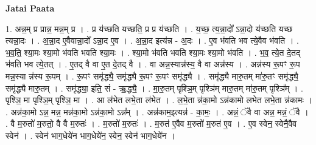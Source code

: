 \documentclass[17pt]{extarticle}
\begin{document}
\textbf{Jatai Paata} \newline

1. अन्न॒म् प्र प्रान्न॒ मन्न॒म् प्र । . प्र य॑च्छति यच्छति॒ प्र प्र य॑च्छति । . य॒च्छ॒ त्य॒न्ना॒दो᳚ ऽन्ना॒दो य॑च्छति यच्छ त्यन्ना॒दः । . अ॒न्ना॒द ए॒वैवान्ना॒दो᳚ ऽन्ना॒द ए॒व । . अ॒न्ना॒द इत्य॑न्न - अ॒दः । . ए॒व भ॑वति भव त्ये॒वैव भ॑वति । . भ॒व॒ति॒ श्या॒मः श्या॒मो भ॑वति भवति श्या॒मः । . श्या॒मो भ॑वति भवति श्या॒मः श्या॒मो भ॑वति । . भ॒व॒ त्ये॒त दे॒तद् भ॑वति भव त्ये॒तत् । . ए॒तद् वै वा ए॒त दे॒तद् वै । . वा अन्न॒स्यान्न॑स्य॒ वै वा अन्न॑स्य । . अन्न॑स्य रू॒पꣳ रू॒प मन्न॒स्या न्न॑स्य रू॒पम् । . रू॒पꣳ समृ॑द्ध्यै॒ समृ॑द्ध्यै रू॒पꣳ रू॒पꣳ समृ॑द्ध्यै । . समृ॑द्ध्यै मारु॒तम् मा॑रु॒तꣳ समृ॑द्ध्यै॒ समृ॑द्ध्यै मारु॒तम् । . समृ॑द्ध्या॒ इति॒ सं - ऋ॒द्ध्यै॒ । . मा॒रु॒तम् पृश्ञि॒म् पृश्ञि॑म् मारु॒तम् मा॑रु॒तम् पृश्ञि᳚म् । . पृश्ञि॒ मा पृश्ञि॒म् पृश्ञि॒ मा । . आ ल॑भेत लभे॒ता ल॑भेत । . ल॒भे॒ता न्न॑का॒मो ऽन्न॑कामो लभेत लभे॒ता न्न॑कामः । . अन्न॑का॒मो ऽन्न॒ मन्न॒ मन्न॑का॒मो ऽन्न॑का॒मो ऽन्न᳚म् । . अन्न॑काम॒इत्यन्न॑ - का॒मः॒ । . अन्नं॒ ॅवै वा अन्न॒ मन्नं॒ ॅवै । . वै म॒रुतो॑ म॒रुतो॒ वै वै म॒रुतः॑ । . म॒रुतो॑ म॒रुतः॑ । . म॒रुत॑ ए॒वैव म॒रुतो॑ म॒रुत॑ ए॒व । . ए॒व स्वेन॒ स्वेनै॒वैव स्वेन॑ । . स्वेन॑ भाग॒धेये॑न भाग॒धेये॑न॒ स्वेन॒ स्वेन॑ भाग॒धेये॑न । \newline
\end{document}
